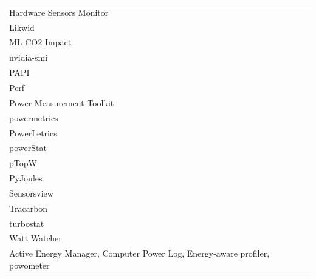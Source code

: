 \documentclass[
  acmsmall,
  screen,
  review,
  xcolor={dvipsnames,usenames}
]{acmart}
\begin{document}
{\begin{longtable}{@{}>{\raggedright\arraybackslash}p{5.5cm}>{\raggedright\arraybackslash}p{\dimexpr\linewidth-5.5cm-2\tabcolsep\relax}@{}}
Hardware Sensors Monitor & \cite{jagroepProfilingEnergyProfilers2015}\\
Likwid & \cite{jayExperimentalComparisonSoftwarebased2023,raffinDissectingSoftwarebasedMeasurement2025}\\
ML CO2 Impact & \cite{jayExperimentalComparisonSoftwarebased2023,pathaniaCalculatingSoftwaresEnergy2025}\\
nvidia-smi & \cite{jayExperimentalComparisonSoftwarebased2023}\\
PAPI & \cite{jayExperimentalComparisonSoftwarebased2023}\\
Perf & \cite{jayExperimentalComparisonSoftwarebased2023,aneggiMeasuringSoftwareEnergy2026}\\
Power Measurement Toolkit & \cite{pathaniaCalculatingSoftwaresEnergy2025}\\
powermetrics & \cite{jayExperimentalComparisonSoftwarebased2023}\\
PowerLetrics \cite{geerd-dietgerPowerLetricsOpenSourceFramework2025,GreenkernelPowerletrics2026} & \cite{aneggiMeasuringSoftwareEnergy2026}\\
powerStat & \cite{jayExperimentalComparisonSoftwarebased2023}\\
pTopW & \cite{jagroepProfilingEnergyProfilers2015}\\
PyJoules & \cite{jayExperimentalComparisonSoftwarebased2023,pathaniaCalculatingSoftwaresEnergy2025}\\
Sensorsview & \cite{jagroepProfilingEnergyProfilers2015}\\
Tracarbon & \cite{pathaniaCalculatingSoftwaresEnergy2025}\\
turbostat & \cite{aneggiMeasuringSoftwareEnergy2026,pathaniaCalculatingSoftwaresEnergy2025}\\
Watt Watcher & \cite{fieniSmartWattsSelfCalibratingSoftwareDefined2020}\\
Active Energy Manager, Computer Power Log, Energy-aware profiler, powometer & \cite{jagroepProfilingEnergyProfilers2015}\\
\end{longtable}
}
\end{document}
